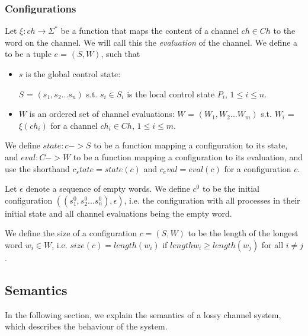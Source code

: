 \subsubsection{Configurations}
Let $\xi : ch \rightarrow \Sigma^*$ be a function that maps the content of a channel $ch \in Ch$ to the word on the channel. We will call this the \emph{evaluation} of the channel. We define a  to be a tuple $c$ = $(S, W)$, such that

\begin{itemize}
  \item $s$ is the global control state:

   $S$ = $(s_1, s_2... s_n)$ s.t. $s_i \in S_i$ is the local control state $P_i$, $1 \leq i \leq n$.
  \item $W$ is an ordered set of channel evaluations: $W$ = $(W_1, W_2...W_m)$ s.t. $W_i$ = $\xi(ch_i)$ for a channel $ch_i \in Ch$, $1 \leq i \leq m$.
\end{itemize}

We define $state : c -> S$ to be a function mapping a configuration to its state, and $eval : C -> W$ to be a function mapping a configuration to its evaluation, and use the shorthand $c_state = state(c)$ and $c_eval = eval(c)$ for a configuration $c$.

Let $\epsilon$ denote a sequence of empty words. We define $c^0$ to be the initial configuration $((s_1^0, s_2^0...s_n^0), \epsilon)$, i.e. the configuration with all processes in their initial state and all channel evaluations being the empty word.

We define the size of a configuration $c = (S,W)$ to be the length of the longest word $w_i \in W$, i.e. $size(c) = length(w_i)$ if $length w_i \geq length(w_j)$ for all $i \neq j$.

\subsection{Semantics}
In the following section, we explain the semantics of a lossy channel system, which describes the behaviour of the system.


